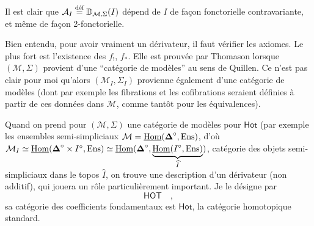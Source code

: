 \noindent{}Il est clair que $\mathcal{A}_I \defeq \DD_{\mathcal{M},\Sigma}(I)$ dépend de $I$ de façon fonctorielle contravariante, et même de façon 2-fonctorielle.

Bien entendu, pour avoir vraiment un dérivateur, il faut vérifier les axiomes. Le plus fort est l’existence des $f_!$, $f_*$. Elle est prouvée par Thomason lorsque $(\mathcal{M},\Sigma)$ provient d’une “catégorie de modèles” au sens de Quillen. Ce n’est pas clair pour moi qu’alors $(\mathcal{M}_I,\Sigma_I)$ provienne également d’une catégorie de modèles (dont par exemple les fibrations %
et les cofibrations seraient définies à partir de ces données dans $\mathcal{M}$, comme tantôt pour les équivalences).

Quand on prend pour $(\mathcal{M},\Sigma)$ une catégorie de modèles pour $\mathsf{Hot}$ (par exemple les ensembles semi-simpliciaux $\mathcal{M} = \uHom(\bDelta^\circ,\Ens)$, d’où $\mathcal{M}_I \simeq \uHom(\bDelta^\circ \times I^\circ,\Ens) \simeq \uHom(\bDelta^\circ,\underbrace{\uHom(I^\circ,\Ens)}_{\widehat{I}})$, catégorie des objets semi-simpliciaux dans le topos $\widehat{I}$, on trouve une description d’un dérivateur (non additif), qui jouera un rôle particulièrement important. Je le désigne par %
\[
\mathsf{HOT} \quad ,
\]
sa catégorie des coefficients fondamentaux est $\mathsf{Hot}$, la catégorie homotopique standard.

